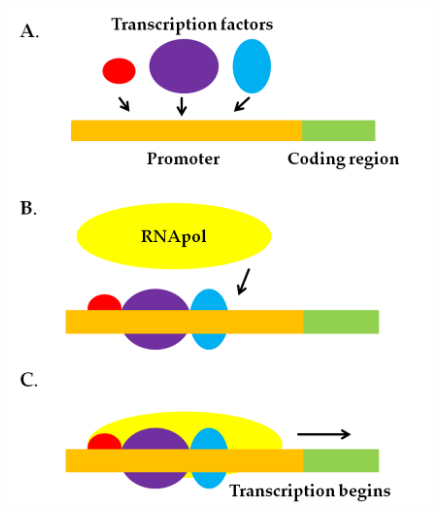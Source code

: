 \documentclass[xcolor=dvipsnames]{beamer}
\begin{document}
\begin{frame}
\begin{columns}[c]
\begin{figure}[p]
    \centering
    \includegraphics[width=1\textwidth]{con-tf_simple}
\end{figure}
\end{columns}
\end{frame}
\end{document}
